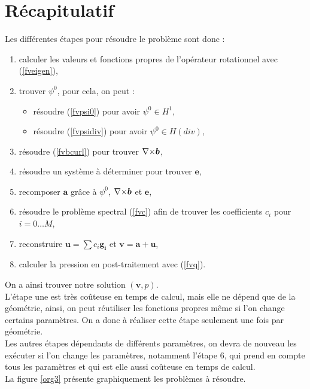 \chapter{Récapitulatif}

Les différentes étapes pour résoudre le problème sont donc :
\begin{enumerate}
\item calculer les valeurs et fonctions propres de l'opérateur rotationnel avec (\ref{fveigen}),
\item trouver $\psi^0$, pour cela, on peut :
\begin{itemize}
\item résoudre (\ref{fvpsi0}) pour avoir $\psi^0\in H^1$,
\item résoudre (\ref{fvpsidiv}) pour avoir $\psi^0\in H(div)$,
\end{itemize}
\item résoudre (\ref{fvbcurl}) pour trouver ${\nabla\times}\bm{b}$,
\item résoudre un système à déterminer pour trouver $\bm{e}$,
\item recomposer $\bm{a}$ grâce à $\psi^0$, ${\nabla\times}\bm{b}$ et $\bm{e}$,
\item résoudre le problème spectral (\ref{fvc}) afin de trouver les coefficients $c_i$ pour $i=0\dots M$,
\item reconstruire $\bm{u}=\sum c_i \bm{g_i}$ et $\bm{v}=\bm{a}+\bm{u}$,
\item calculer la pression en post-traitement avec (\ref{fvq}).
\end{enumerate}

On a ainsi trouver notre solution $(\mathbf{v},p)$.\\
L'étape une est très coûteuse en temps de calcul, mais elle ne dépend que de la géométrie, ainsi, on peut réutiliser les fonctions propres même si l'on change certains paramètres. On a donc à réaliser cette étape seulement une fois par géométrie.\\
Les autres étapes dépendants de différents paramètres, on devra de nouveau les exécuter si l'on change les paramètres, notamment l'étape 6, qui prend en compte tous les paramètres et qui est elle aussi coûteuse en temps de calcul.\\

La figure \ref{org3} présente graphiquement les problèmes à résoudre.\\

